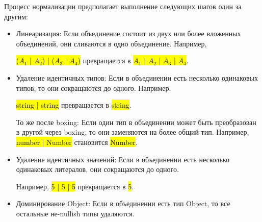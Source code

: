 Процесс нормализации предполагает выполнение следующих шагов один за другим:

\begin{itemize}[left=2em]
    \item Линеаризация: Если объединение состоит из двух или более вложенных объединений, они сливаются в одно объединение.
    Например,

    \hl{($A_1$ | $A_2$) | ($A_3$ | $A_4$)} превращается в \hl{$A_1$ | $A_2$ | $A_3$ | $A_4$}.
    \item Удаление идентичных типов: Если в объединении есть несколько одинаковых типов, то они сокращаются до одного.
    Например,

    \hl{string | string} превращается в \hl{string}.

    То же после boxing: Если один тип в объединении может быть преобразован в другой через boxing, то они заменяются на
    более общий тип.
    Например, \hl{number | Number} становится \hl{Number}.
    \item Удаление идентичных значений: Если в объединении есть несколько одинаковых литералов, они сокращаются до одного.

    Например, \hl{5 | 5 | 5} превращается в \hl{5}.
    \item Доминирование Object: Если в объединении есть тип Object, то все остальные не-nullish типы удаляются.


\end{itemize}
